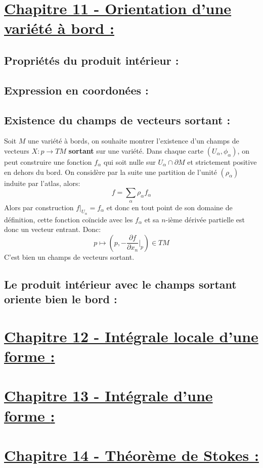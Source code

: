 \section*{\uline{Chapitre 11 - Orientation d'une variété à bord {:}}}
   \subsection*{Propriétés du produit intérieur {:}}
   \subsection*{Expression en coordonées {:}}

   \subsection*{Existence du champs de vecteurs sortant {:}}
   Soit $M$ une variété à bords, on souhaite montrer l'existence d'un champs de vecteurs $X : p \rightarrow TM$ \textbf{sortant} sur une variété. Dans chaque carte $(U_\alpha, \phi_\alpha)$, on peut construire une fonction $f_\alpha$ qui soit nulle sur $U_\alpha \cap \partial M$ et strictement positive en dehors du bord. On considère par la suite une partition de l'unité $(\rho_\alpha)$ induite par l'atlas, alors:
      $$
         f = \sum_\alpha \rho_\alpha f_\alpha
      $$
      Alors par construction $f|_{U_\alpha} = f_\alpha$ et donc en tout point de son domaine de définition, cette fonction coïncide avec les $f_\alpha$ et sa $n$-ième dérivée partielle est donc un vecteur entrant. Donc:
      $$
         p \longmapsto (p, -\frac{\partial f}{\partial x_n}\big|_p) \in TM
      $$
      C'est bien un champs de vecteurs sortant.
   \subsection*{Le produit intérieur avec le champs sortant oriente bien le bord {:}}

\section*{\uline{Chapitre 12 - Intégrale locale d'une forme {:}}}

\section*{\uline{Chapitre 13 - Intégrale d'une forme {:}}}

\section*{\uline{Chapitre 14 - Théorème de Stokes {:}}}
